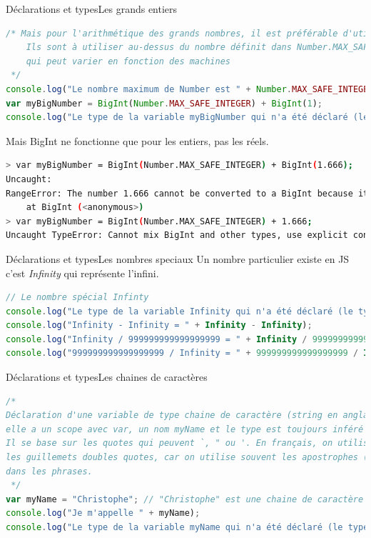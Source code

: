 \documentclass{beamer}
\begin{document}
    \begin{frame}[fragile]{Déclarations et types}{Les grands entiers}
        \begin{lstlisting}[language=JavaScript]
/* Mais pour l'arithmétique des grands nombres, il est préférable d'utiliser BigInt.
    Ils sont à utiliser au-dessus du nombre définit dans Number.MAX_SAFE_INTEGER
    qui peut varier en fonction des machines
 */
console.log("Le nombre maximum de Number est " + Number.MAX_SAFE_INTEGER);
var myBigNumber = BigInt(Number.MAX_SAFE_INTEGER) + BigInt(1);
console.log("Le type de la variable myBigNumber qui n'a été déclaré (le type) est " + typeof myBigNumber);
        \end{lstlisting}
        \begin{dangercolorbox}
            Mais BigInt ne fonctionne que pour les entiers, pas les réels.
        \end{dangercolorbox}
        \begin{lstlisting}[language=Bash]
> var myBigNumber = BigInt(Number.MAX_SAFE_INTEGER) + BigInt(1.666);
Uncaught:
RangeError: The number 1.666 cannot be converted to a BigInt because it is not an integer
    at BigInt (<anonymous>)
> var myBigNumber = BigInt(Number.MAX_SAFE_INTEGER) + 1.666;
Uncaught TypeError: Cannot mix BigInt and other types, use explicit conversions
        \end{lstlisting}
    \end{frame}

    \begin{frame}[fragile]{Déclarations et types}{Les nombres speciaux}
        Un nombre particulier existe en JS c'est \textit{Infinity} qui représente l'infini.
        \begin{lstlisting}[language=JavaScript]
// Le nombre spécial Infinty
console.log("Le type de la variable Infinity qui n'a été déclaré (le type) est " + typeof Infinity);
console.log("Infinity - Infinity = " + Infinity - Infinity);
console.log("Infinity / 999999999999999999 = " + Infinity / 999999999999999999);
console.log("999999999999999999 / Infinity = " + 999999999999999999 / Infinity);
        \end{lstlisting}
    \end{frame}

    \begin{frame}[fragile]{Déclarations et types}{Les chaines de caractères}
        \begin{lstlisting}[language=JavaScript]
/*
Déclaration d'une variable de type chaine de caractère (string en anglais),
elle a un scope avec var, un nom myName et le type est toujours inféré par le langage.
Il se base sur les quotes qui peuvent `, " ou '. En français, on utilise souvent
les guillemets doubles quotes, car on utilise souvent les apostrophes (simple quote)
dans les phrases.
 */
var myName = "Christophe"; // "Christophe" est une chaine de caractère (string en anglais)
console.log("Je m'appelle " + myName);
console.log("Le type de la variable myName qui n'a été déclaré (le type) est " + typeof myName);
        \end{lstlisting}
    \end{frame}
\end{document}
